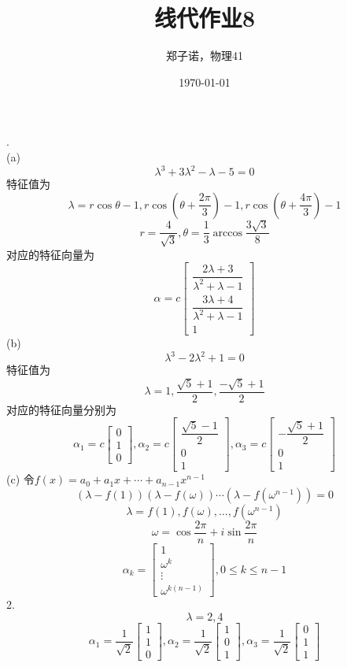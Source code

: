 \documentclass[utf8]{ctexart}
\title{线代作业8}
\author{郑子诺，物理41}
\date{\today}
\begin{document}
\maketitle
{}.\\
(a)\[\lambda^3+3\lambda^2-\lambda-5=0\]
特征值为
\[\lambda=r\cos\theta-1,r\cos(\theta+\frac{2\pi}{3})-1,r\cos(\theta+\frac{4\pi}{3})-1\]
\[r=\frac{4}{\sqrt{3}},\theta=\frac{1}{3}\arccos\frac{3\sqrt{3}}{8}\]
对应的特征向量为
\[\alpha=c\begin{bmatrix}
	\dfrac{2\lambda+3}{\lambda^2+\lambda-1}\\[8pt]
	\dfrac{3\lambda+4}{\lambda^2+\lambda-1}\\[8pt]
	1
\end{bmatrix}\]
(b)
\[\lambda^3-2\lambda^2+1=0\]
特征值为
\[\lambda=1,\frac{\sqrt{5}+1}{2},\frac{-\sqrt{5}+1}{2}\]
对应的特征向量分别为
\[\alpha_1=c\begin{bmatrix}
	0\\[8pt]
	1\\[8pt]
	0
\end{bmatrix},
\alpha_2=c\begin{bmatrix}
	\dfrac{\sqrt{5}-1}{2}\\[8pt]
	0\\[8pt]
	1
\end{bmatrix},
\alpha_3=c\begin{bmatrix}
	-\dfrac{\sqrt{5}+1}{2}\\[8pt]
	0\\[8pt]
	1
\end{bmatrix}\]
(c)
令$f(x)=a_0+a_1x+\cdots+a_{n-1}x^{n-1}$
\[(\lambda-f(1))(\lambda-f(\omega))\cdots(\lambda-f(\omega^{n-1}))=0\]
\[\lambda=f(1),f(\omega),\dots,f(\omega^{n-1})\]
\[\omega=\cos\frac{2\pi}{n}+i\sin\frac{2\pi}{n}\]
\[\alpha_k=\begin{bmatrix}
	1\\
	\omega^{k}\\
	\vdots\\
	\omega^{k(n-1)}
\end{bmatrix},0\le k\le n-1\]
2.\\
\[\lambda=2,4\]
\[\alpha_1=\frac{1}{\sqrt{2}}\begin{bmatrix}
	1\\
	1\\
	0
\end{bmatrix},
\alpha_2=\frac{1}{\sqrt{2}}\begin{bmatrix}
	1\\
	0\\
	1
\end{bmatrix},
\alpha_3=\frac{1}{\sqrt{2}}\begin{bmatrix}
	0\\
	1\\
	1
\end{bmatrix}\]
\end{document}
